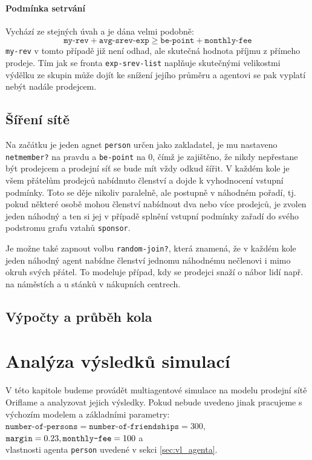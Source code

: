 \documentclass[a4wide,12pt]{report}
\begin{document}
\subsubsection{Podmínka setrvání}
Vychází ze stejných úvah a je dána velmi podobně:
\[ \texttt{my-rev} + \texttt{avg-srev-exp} \geq \texttt{be-point} + \texttt{monthly-fee} \]
\texttt{my-rev} v tomto případě již není odhad, ale skutečná hodnota příjmu z přímeho prodeje. Tím jak se fronta \texttt{exp-srev-list} naplňuje skutečnými velikostmi výdělku ze skupin může dojít ke snížení jejího průměru a agentovi se pak vyplatí nebýt nadále prodejcem.
\section{Šíření sítě}
Na začátku je jeden agnet \texttt{person} určen jako zakladatel, je mu nastaveno \texttt{netmember?} na pravdu a \texttt{be-point} na 0, čímž je zajištěno, že nikdy nepřestane být prodejcem a prodejní síť se bude mít vždy odkud šířit. V každém kole je všem přátelům prodejců nabídnuto členství a dojde k vyhodnocení vstupní podmínky. Toto se děje nikoliv paralelně, ale postupně v náhodném pořadí, tj. pokud některé osobě mohou členství nabídnout dva nebo více prodejců, je zvolen jeden náhodný a ten si jej v případě splnění vstupní podmínky zařadí do svého podstromu grafu vztahů \texttt{sponsor}.

Je možne také zapnout volbu \texttt{random-join?}, která znamená, že v každém kole jeden náhodný agent nabídne členství jednomu náhodnému nečlenovi i mimo okruh svých přátel. To modeluje případ, kdy se prodejci snaží o nábor lidí např. na náměstích a u stánků v nákupních centrech.
\section{Výpočty a průběh kola}
%
%
%
\chapter{Analýza výsledků simulací}
V této kapitole budeme provádět multiagentové simulace na modelu prodejní sítě Oriflame a analyzovat jejich výsledky. Pokud nebude uvedeno jinak pracujeme s výchozím modelem a základními parametry:\\
$\texttt{number-of-persons}=\texttt{number-of-friendships}=300$, \\
$\texttt{margin}=0.23,\\\texttt{monthly-fee}=100$ a\\
vlastnosti agenta \texttt{person} uvedené v sekci \ref{sec:vl_agenta}.
\end{document}
